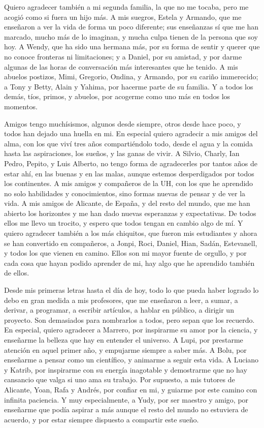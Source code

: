 Quiero agradecer también a mi segunda familia, la que no me tocaba, pero me acogió como si fuera un hijo más.
A mis suegros, Estela y Armando, que me enseñaron a ver la vida de forma un poco diferente; sus enseñanzas sí que me han marcado, mucho más de lo imaginan, y mucha culpa tienen de la persona que soy hoy.
A Wendy, que ha sido una hermana más, por su forma de sentir y querer que no conoce fronteras ni limitaciones; y a Daniel, por su amistad, y por darme algunas de las horas de conversación más interesantes que he tenido.
A mis abuelos postizos, Mimi, Gregorio, Ondina, y Armando, por su cariño immerecido; a Tony y Betty, Alain y Yahima, por hacerme parte de su familia.
Y a todos los demás, tíos, primos, y abuelos, por acogerme como uno más en todos los momentos.

Amigos tengo muchísismos, algunos desde siempre, otros desde hace poco, y todos han dejado una huella en mi.
En especial quiero agradecir a mis amigos del alma, con los que viví tres años compartiéndolo todo, desde el agua y la comida hasta las aspiraciones, los sueños, y las ganas de vivir.
A Silvio, Charly, Ian Pedro, Pepito, y Luis Alberto, no tengo forma de agradecerles por tantos años de estar ahí, en las buenas y en las malas, aunque estemos desperdigados por todos los continentes.
A mis amigos y compañeros de la UH, con los que he aprendido no solo habilidades y conocimientos, sino formas nuevas de pensar y de ver la vida.
A mis amigos de Alicante, de España, y del resto del mundo, que me han abierto los horizontes y me han dado nuevas esperanzas y expectativas.
De todos ellos me llevo un trocito, y espero que todos tengan en cambio algo de mí.
Y quiero agradecer también a los más chiquitos, que fueron mis estudiantes y ahora se han convertido en compañeros, a Jonpi, Roci, Daniel, Hian, Sadán, Estevanell, y todos los que vienen en camino.
Ellos son mi mayor fuente de orgullo, y por cada cosa que hayan podido aprender de mi, hay algo que he aprendido también de ellos.

Desde mis primeras letras hasta el día de hoy, todo lo que pueda haber logrado lo debo en gran medida a mis profesores, que me enseñaron a leer, a sumar, a derivar, a programar, a escribir artículos, a hablar en público, a dirigir un proyecto.
Son demasiados para nombrarlos a todos, pero sepan que los recuerdo.
En especial, quiero agradecer a Marrero, por inspirarme su amor por la ciencia, y enseñarme la belleza que hay en entender el universo.
A Lupi, por prestarme atención en aquel primer año, y empujarme siempre a saber más.
A Bolu, por enseñarme a pensar como un científico, y animarme a seguir esta vida.
A Luciano y Katrib, por inspirarme con su energía inagotable y demostrarme que no hay cansancio que valga si uno ama su trabajo.
Por supuesto, a mis tutores de Alicante, Yoan, Rafa y Andrés, por confiar en mi, y guiarme por este camino con infinita paciencia.
Y muy especialmente, a Yudy, por ser maestro y amigo, por enseñarme que podía aspirar a más aunque el resto del mundo no estuviera de acuerdo, y por estar siempre dispuesto a compartir este sueño.

